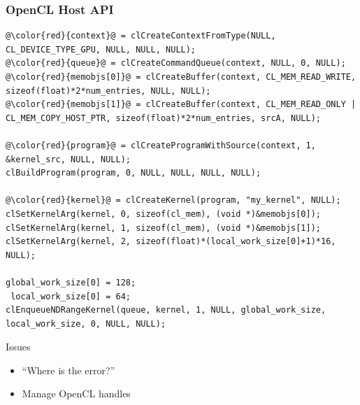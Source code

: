 \begin{frame}[fragile]
\frametitle{OpenCL Host API}

\lstset{ basicstyle=\scriptsize\ttfamily }
\begin{lstlisting}[escapechar=@]
@\color{red}{context}@ = clCreateContextFromType(NULL, CL_DEVICE_TYPE_GPU, NULL, NULL, NULL);
@\color{red}{queue}@ = clCreateCommandQueue(context, NULL, 0, NULL);
@\color{red}{memobjs[0]}@ = clCreateBuffer(context, CL_MEM_READ_WRITE, sizeof(float)*2*num_entries, NULL, NULL);
@\color{red}{memobjs[1]}@ = clCreateBuffer(context, CL_MEM_READ_ONLY | CL_MEM_COPY_HOST_PTR, sizeof(float)*2*num_entries, srcA, NULL);
 
@\color{red}{program}@ = clCreateProgramWithSource(context, 1, &kernel_src, NULL, NULL);
clBuildProgram(program, 0, NULL, NULL, NULL, NULL);
 
@\color{red}{kernel}@ = clCreateKernel(program, "my_kernel", NULL);
clSetKernelArg(kernel, 0, sizeof(cl_mem), (void *)&memobjs[0]);
clSetKernelArg(kernel, 1, sizeof(cl_mem), (void *)&memobjs[1]);
clSetKernelArg(kernel, 2, sizeof(float)*(local_work_size[0]+1)*16, NULL);
 
global_work_size[0] = 128;
 local_work_size[0] = 64;
clEnqueueNDRangeKernel(queue, kernel, 1, NULL, global_work_size, local_work_size, 0, NULL, NULL);
\end{lstlisting}
\lstset{ basicstyle=\small\ttfamily }

\begin{block}{Issues}
 \begin{itemize}
  \item ``Where is the error?''
  \item Manage OpenCL handles
 \end{itemize}

\end{block}

\end{frame}


